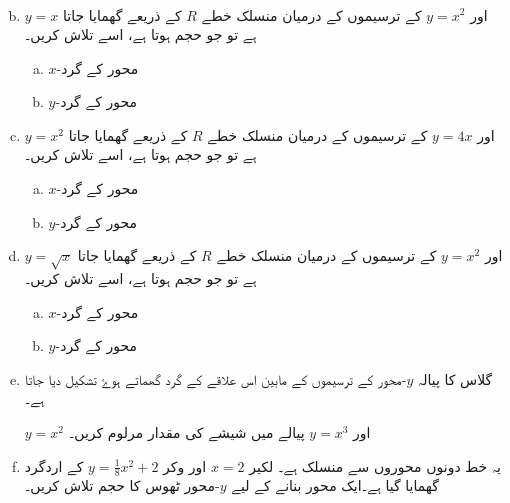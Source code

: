 \begin{enumerate}[a.]
\begin{align*}
\end{align*}
\item
\(y=x \) اور \(y=x^{2}\) کے ترسیموں کے درمیان منسلک خطے \(R\) کے ذریعے گھمایا جاتا ہے تو جو حجم ہوتا ہے، اسے تلاش کریں۔
\begin{enumerate}[a.]
\item
\(x\)-محور کے گرد
\item
\(y\)-محور کے گرد
\end{enumerate}
\item
\(y=x^{2}\) اور \(y=4x \) کے ترسیموں کے درمیان منسلک خطے \(R\) کے ذریعے گھمایا جاتا ہے تو جو حجم ہوتا ہے، اسے تلاش کریں۔
\begin{enumerate}[a.]
\item
\(x\)-محور کے گرد
\item
\(y\)-محور کے گرد
\end{enumerate}
\item
 \(y=\sqrt{x} \) اور \(y=x^{2}\) کے ترسیموں کے درمیان منسلک خطے \(R\) کے ذریعے گھمایا جاتا ہے تو جو حجم ہوتا ہے، اسے تلاش کریں۔
\begin{enumerate}[a.]
\item
\(x\)-محور کے گرد
\item
\(y\)-محور کے گرد
\end{enumerate}
\item
گلاس کا پیالہ \(y\)-محور کے ترسیموں کے مابین اس علاقے کے گرد گھماتے ہوۓ تشکیل دیا جاتا ہے۔

\(y=x^{2}\) اور \(y=x^{3}\) پیالے میں شیشے کی مقدار مرلوم کریں۔
\item
یہ خط دونوں محوروں سے منسلک ہے۔ لکیر \(x=2\) اور وکر \(y=\frac{1}{8} x^{2}+2\) کے اردگرد گھمایا گیا ہے۔ایک محور بنانے کے لیے \(y\)-محور ٹھوس کا حجم تلاش کریں۔
\end{enumerate}


